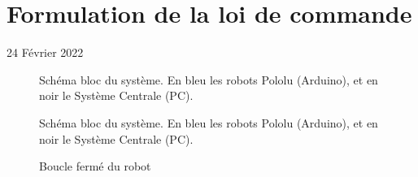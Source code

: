 \section{Formulation de la loi de commande}

\begin{flushright}
24 Février 2022
\end{flushright}

\begin{figure}[h!]
    \centering
    
    \caption{Schéma bloc du système. En bleu les robots Pololu (Arduino), et en noir le Système Centrale (PC).}
    \label{fig:formulation_commande}
\end{figure}

\begin{figure}[h!]
    \centering
    
    \caption{Schéma bloc du système. En bleu les robots Pololu (Arduino), et en noir le Système Centrale (PC).}
    \label{fig:formulation_commande}
\end{figure}

\begin{figure}[h!]
    \centering
    
    \caption{Boucle fermé du robot}
    \label{fig:formulation_commande}
\end{figure}
